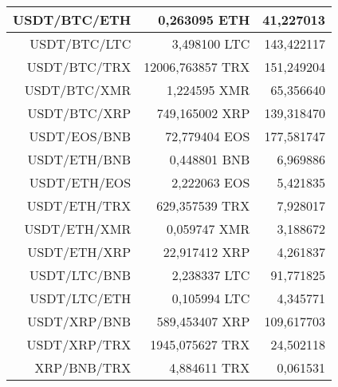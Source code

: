 \begin{table}
\begin{tabular}{|| r | r | r ||}
 \hline USDT/BTC/ETH & 0,263095 ETH & 41,227013\\ 
 \hline USDT/BTC/LTC & 3,498100 LTC & 143,422117\\ 
 \hline USDT/BTC/TRX & 12006,763857 TRX & 151,249204\\ 
 \hline USDT/BTC/XMR & 1,224595 XMR & 65,356640\\ 
 \hline USDT/BTC/XRP & 749,165002 XRP & 139,318470\\ 
 \hline USDT/EOS/BNB & 72,779404 EOS & 177,581747\\ 
 \hline USDT/ETH/BNB & 0,448801 BNB & 6,969886\\ 
 \hline USDT/ETH/EOS & 2,222063 EOS & 5,421835\\ 
 \hline USDT/ETH/TRX & 629,357539 TRX & 7,928017\\ 
 \hline USDT/ETH/XMR & 0,059747 XMR & 3,188672\\ 
 \hline USDT/ETH/XRP & 22,917412 XRP & 4,261837\\ 
 \hline USDT/LTC/BNB & 2,238337 LTC & 91,771825\\ 
 \hline USDT/LTC/ETH & 0,105994 LTC & 4,345771\\ 
 \hline USDT/XRP/BNB & 589,453407 XRP & 109,617703\\ 
 \hline USDT/XRP/TRX & 1945,075627 TRX & 24,502118\\ 
 \hline XRP/BNB/TRX & 4,884611 TRX & 0,061531\\ 
 \hline
\end{tabular}
\end{table}